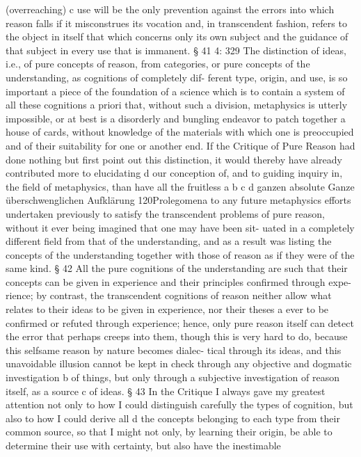 (overreaching) c use will be the only prevention against the errors into
which reason falls if it misconstrues its vocation and, in transcendent
fashion, refers to the object in itself that which concerns only its own
subject and the guidance of that subject in every use that is immanent.
§ 41
4: 329
The distinction of ideas, i.e., of pure concepts of reason, from categories,
or pure concepts of the understanding, as cognitions of completely dif-
ferent type, origin, and use, is so important a piece of the foundation of
a science which is to contain a system of all these cognitions a priori that,
without such a division, metaphysics is utterly impossible, or at best is
a disorderly and bungling endeavor to patch together a house of cards,
without knowledge of the materials with which one is preoccupied and
of their suitability for one or another end. If the Critique of Pure Reason
had done nothing but ﬁrst point out this distinction, it would thereby
have already contributed more to elucidating d our conception of, and to
guiding inquiry in, the ﬁeld of metaphysics, than have all the fruitless
a
b
c
d
ganzen
absolute Ganze
überschwenglichen
Aufklärung
120Prolegomena to any future metaphysics
efforts undertaken previously to satisfy the transcendent problems of
pure reason, without it ever being imagined that one may have been sit-
uated in a completely different ﬁeld from that of the understanding, and
as a result was listing the concepts of the understanding together with
those of reason as if they were of the same kind.
§ 42
All the pure cognitions of the understanding are such that their concepts
can be given in experience and their principles conﬁrmed through expe-
rience; by contrast, the transcendent cognitions of reason neither allow
what relates to their ideas to be given in experience, nor their theses a ever
to be conﬁrmed or refuted through experience; hence, only pure reason
itself can detect the error that perhaps creeps into them, though this is
very hard to do, because this selfsame reason by nature becomes dialec-
tical through its ideas, and this unavoidable illusion cannot be kept in
check through any objective and dogmatic investigation b of things, but
only through a subjective investigation of reason itself, as a source c of
ideas.
§ 43
In the Critique I always gave my greatest attention not only to how I
could distinguish carefully the types of cognition, but also to how
I could derive all d the concepts belonging to each type from their
common source, so that I might not only, by learning their origin, be
able to determine their use with certainty, but also have the inestimable

